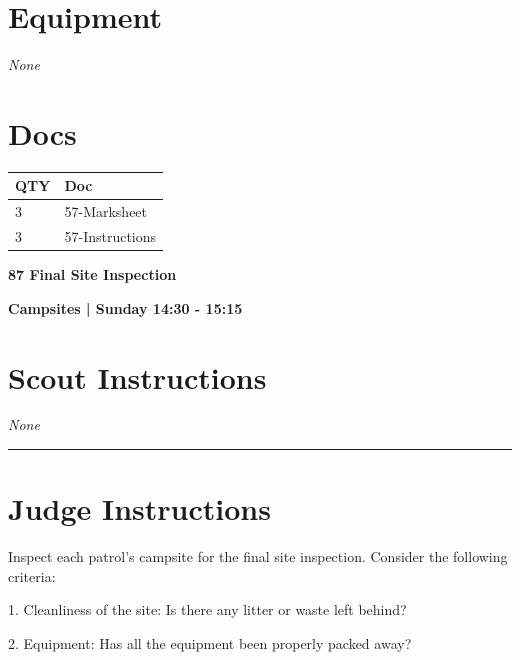 \documentclass[10pt]{article}
\newcommand{\newtitle}[1]{\begin{center}{\Huge\bfseries #1 }\\ \vspace{5mm}\end{center}}
\newcommand{\newsubtitle}[1]{\begin{center}{\color{grey}\Large\bfseries #1 }\\ \vspace{5mm}\end{center}}
\begin{document}
	\begin{multicols}{2}

		\section*{\faWrench \: Equipment}

				\textit{None}
		
		\vfill\null
		\columnbreak

			\section*{\faFile \: Docs}
		 	\begin{center}
			\begin{tabular}{p{2cm}p{4cm}}

			\textbf{QTY} & \textbf{Doc} \\\toprule
										3&57-Marksheet\\\midrule
										3&57-Instructions\\\midrule
							\end{tabular}
			\end{center}
	

		\vfill\null

		\end{multicols}



	\vspace{1cm}


	\clearpage
		\newtitle{87 Final Site Inspection }
	\newsubtitle{Campsites | Sunday 14:30 - 15:15}
		\setcounter{section}{86}
	\section*{Scout Instructions}
		\textit{None}
	
	\vspace{0.5cm}
	\hrule
	\vspace{0.5cm}

		\section*{Judge Instructions}
		Inspect each patrol's campsite for the final site inspection. Consider the following criteria:



1. Cleanliness of the site: Is there any litter or waste left behind?

2. Equipment: Has all the equipment been properly packed away?
\end{document}
